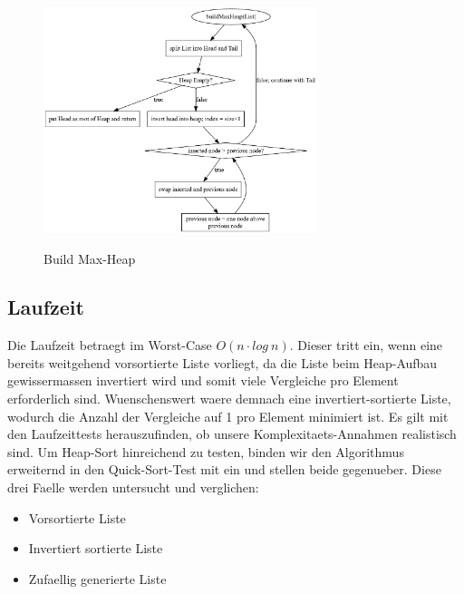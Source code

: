 \documentclass[11pt]{article}
\begin{document}
    \begin{figure}[hbt]
        \caption{Build Max-Heap}
        \centering
        \includegraphics[width = 8cm]{buildMaxHeap.pdf}\label{fig:buildMaxHeap}
    \end{figure}
    
    \subsection{Laufzeit}\label{subsec:Hlaufzeit}
    Die Laufzeit betraegt im Worst-Case \(O(n\cdot log\ n)\). Dieser tritt ein, wenn eine bereits weitgehend vorsortierte Liste vorliegt, da die Liste beim Heap-Aufbau gewissermassen invertiert wird und somit viele Vergleiche pro Element erforderlich sind.
    Wuenschenswert waere demnach eine invertiert-sortierte Liste, wodurch die Anzahl der Vergleiche auf 1 pro Element minimiert ist.
    Es gilt mit den Laufzeittests herauszufinden, ob unsere Komplexitaets-Annahmen realistisch sind.
    Um Heap-Sort hinreichend zu testen, binden wir den Algorithmus erweiternd in den Quick-Sort-Test mit ein und stellen beide gegenueber.
    Diese drei Faelle werden untersucht und verglichen:
    \begin{itemize}
        \item Vorsortierte Liste
        \item Invertiert sortierte Liste
        \item Zufaellig generierte Liste
    \end{itemize}
    

    
    
    
\end{document}

